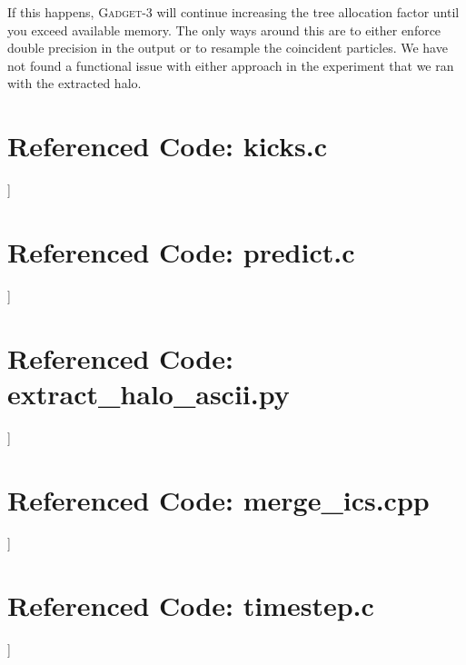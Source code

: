 If this happens, \textsc{Gadget-3} will continue increasing the tree allocation factor until you exceed available memory. The only ways around this are to either enforce double precision in the output or to resample the coincident particles. We have not found a functional issue with either approach in the experiment that we ran with the extracted halo.



\chapter{Referenced Code: kicks.c} \label{ch:kicks.c}
]

\chapter{Referenced Code: predict.c} \label{ch:predict.c}
]


\chapter{Referenced Code: extract\_halo\_ascii.py} \label{ch:extract_halo_ascii.py}
]
    

\chapter{Referenced Code: merge\_ics.cpp} \label{ch:merge_ics.cpp}
]
    
\chapter{Referenced Code: timestep.c} \label{ch:timestep.c}
] 
       

